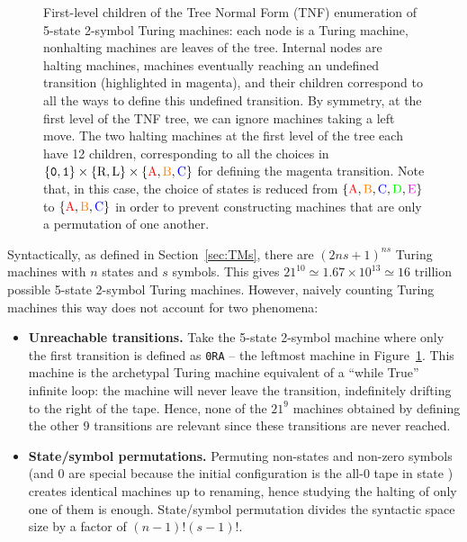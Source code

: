 \begin{figure}[ht]
{\begin{tikzpicture}
        \end{tikzpicture}
    }
    \caption{First-level children of the Tree Normal Form (TNF) enumeration of 5-state 2-symbol Turing machines: each node is a Turing machine, nonhalting machines are leaves of the tree. Internal nodes are halting machines, \ie machines eventually reaching an undefined transition (highlighted in magenta), and their children correspond to all the ways to define this undefined transition. By symmetry, at the first level of the TNF tree, we can ignore machines taking a left move. The two halting machines at the first level of the tree each have 12 children, corresponding to all the choices in $\{\szero,\sone\}\times\{\text{R},\text{L}\}\times\{\text{\stateA},\text{\stateB},\text{\stateC}\}$ for defining the magenta transition. Note that, in this case, the choice of states is reduced from $\{\text{\stateA},\text{\stateB},\text{\stateC},\text{\stateD},\text{\stateE}\}$ to $\{\text{\stateA},\text{\stateB},\text{\stateC}\}$ in order to prevent constructing machines that are only a permutation of one another.}\label{fig:TNF}
\end{figure}



Syntactically, as defined in Section~\ref{sec:TMs}, there are $(2ns + 1)^{ns}$ Turing machines with $n$ states and $s$ symbols. This gives $21^{10} \simeq 1.67\times10^{13} \simeq 16 \text{ trillion}$ possible 5-state 2-symbol Turing machines. However, naively counting Turing machines this way does not account for two phenomena:
\begin{itemize}
    \item \textbf{Unreachable transitions.} Take the 5-state 2-symbol machine where only the first transition is defined as \texttt{0RA} -- the leftmost machine in Figure~\ref{fig:TNF}. This machine is the archetypal Turing machine equivalent of a ``while True'' infinite loop: the machine will never leave the transition, indefinitely drifting to the right of the tape. Hence, none of the $21^9$ machines obtained by defining the other 9 transitions are relevant since these transitions are never reached.
    \item \textbf{State/symbol permutations.} Permuting non-\stateA states and non-zero symbols (\stateA and 0 are special because the initial configuration is the all-0 tape in state \stateA) creates identical machines up to renaming, hence studying the halting of only one of them is enough. State/symbol permutation divides the syntactic space size by a factor of $(n-1)! (s-1)!$.
\end{itemize}

